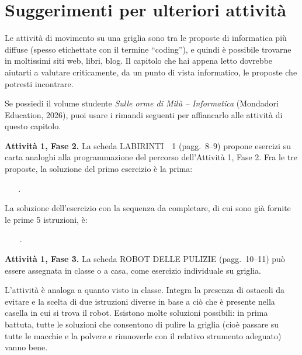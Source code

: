 \section{Suggerimenti per ulteriori attività}\label{suggerimenti-per-ulteriori-attivituxe0-e-riferimenti-1}

Le attività di movimento su una griglia sono tra le proposte di informatica più diffuse (spesso etichettate con il termine ``coding''), e quindi è possibile trovarne in moltissimi siti web, libri, blog. Il capitolo che hai appena letto dovrebbe aiutarti a valutare criticamente, da un punto di vista informatico, le proposte che potresti incontrare.

\printbibliography[heading=none,keyword={cap4},category={attivita}]

\begin{rimandiquaderno}
Se possiedi il volume studente \emph{Sulle orme di Milù -- Informatica}
(Mondadori Education, 2026), puoi usare i rimandi seguenti per affiancarlo
alle attività di questo capitolo.\par\smallskip

\textbf{Attività 1, Fase 2.} La scheda LABIRINTI~\textbullet{}~1 (pagg.~8--9) propone esercizi su carta analoghi alla programmazione del percorso dell'Attività 1, Fase 2. Fra le tre proposte, la soluzione del primo esercizio è la prima:
\par\smallskip
\mbox{\iconAvanti\,\iconSx\,\iconAvanti\,\iconDx\,\iconAvanti\,\iconDx\,\iconAvanti\,\iconSx\,\iconAvanti\,\iconAvanti\,\iconAvanti.}
\par\smallskip
La soluzione dell'esercizio con la sequenza da completare, di cui sono già fornite le prime 5 istruzioni, è:
\par\smallskip
\mbox{\iconAvanti\,\iconSx\,\iconAvanti\,\iconAvanti\,\iconDx\,\iconAvanti\,\iconAvanti\,\iconDx\,\iconAvanti\,\iconSx\,\iconAvanti\,\iconAvanti.}

\textbf{Attività 1, Fase 3.} La scheda ROBOT DELLE PULIZIE (pagg.~10--11) può essere assegnata in classe o a casa, come esercizio individuale su griglia.

L'attività è analoga a quanto visto in classe. Integra la presenza di ostacoli da evitare e la scelta di due istruzioni diverse in base a ciò che è presente nella casella in cui si trova il robot. Esistono molte soluzioni possibili: in prima battuta, tutte le soluzioni che consentono di pulire la griglia (cioè passare su tutte le macchie e la polvere e rimuoverle con il relativo strumento adeguato) vanno bene.


\end{rimandiquaderno}
